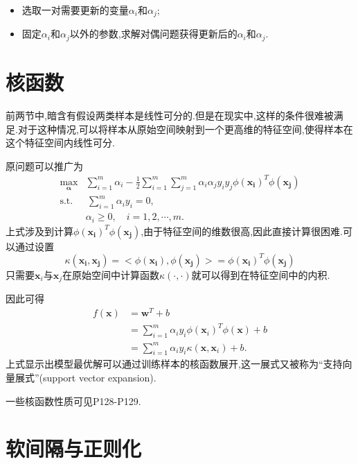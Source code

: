 \begin{itemize}
\item 选取一对需要更新的变量$\alpha_i$和$\alpha_j$;
\item 固定$\alpha_i$和$\alpha_j$以外的参数,求解对偶问题获得更新后的$\alpha_i$和$\alpha_j$.
\end{itemize}

\section{核函数}

前两节中,暗含有假设两类样本是线性可分的.但是在现实中,这样的条件很难被满足.对于这种情况,可以将样本从原始空间映射到一个更高维的特征空间,使得样本在这个特征空间内线性可分.

原问题可以推广为
\begin{equation}\begin{split}
\max_{\mathbf\alpha}&\sum_{i=1}^m\alpha_i-\frac{1}{2}\sum_{i=1}^m\sum_{j=1}^m\alpha_i\alpha_jy_iy_j\phi(\mathbf{x_i})^T\phi(\mathbf{x_j})\\
\text{s.t.}&\,\sum_{i=1}^m\alpha_iy_i=0,\\
&\alpha_i\ge 0,\quad i=1,2,\cdots,m.
\end{split}\end{equation}
上式涉及到计算$\phi(\mathbf{x_i})^T\phi(\mathbf{x_j})$,由于特征空间的维数很高,因此直接计算很困难.可以通过设置
\begin{equation}\kappa(\mathbf{x_i,x_j})=<\phi(\mathbf{x_i}),\phi(\mathbf{x_j})>=\phi(\mathbf{x_i})^T\phi(\mathbf{x_j})\end{equation}
只需要$\mathbf x_i$与$\mathbf x_j$在原始空间中计算函数$\kappa(\cdot,\cdot)$就可以得到在特征空间中的内积.

因此可得
\begin{equation}\begin{split}
f(\mathbf x)&=\mathbf w^T+b\\
&=\sum_{i=1}^m\alpha_iy_i\phi(\mathbf x_i)^T\phi(\mathbf x)+b\\
&=\sum_{i=1}^m\alpha_iy_i\kappa(\mathbf x,\mathbf x_i)+b.
\end{split}\end{equation}
上式显示出模型最优解可以通过训练样本的核函数展开,这一展式又被称为``支持向量展式''(support vector expansion).

一些核函数性质可见P128-P129.

\section{软间隔与正则化}


